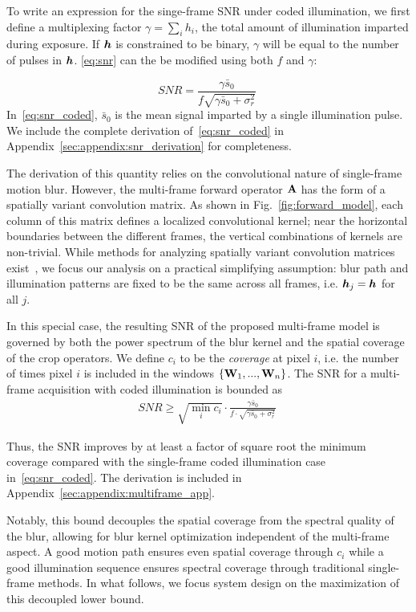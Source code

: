 To write an expression for the singe-frame SNR under coded illumination, we first define a multiplexing factor $\gamma=\sum_{i} h_i$, the total amount of illumination imparted during exposure. If $\bm{h}$ is constrained to be binary, $\gamma$ will be equal to the number of pulses in $\bm{h}$. \eqref{eq:snr} can the be modified using both $f$ and $\gamma$:

\begin{equation}
    \label{eq:snr_coded}
    SNR  = \frac{\gamma\bar{s}_0}{f\sqrt{\gamma\bar{s}_0 + \sigma^2_{r}}}\:
\end{equation}
In~\eqref{eq:snr_coded}, $\bar{s}_0$ is the mean signal imparted by a single illumination pulse. We include the complete derivation of~\eqref{eq:snr_coded} in Appendix~\ref{sec:appendix:snr_derivation} for completeness. 

The derivation of this quantity relies on the convolutional nature of single-frame motion blur. 
However, the multi-frame forward operator $\mathbf{A}$ has the form of a spatially variant convolution matrix. As shown in Fig.~\ref{fig:forward_model},
each column of this matrix defines a localized convolutional kernel; near the horizontal boundaries between the different frames, the vertical combinations of kernels are non-trivial. 
While methods for analyzing spatially variant convolution matrices exist~\cite{chan2011bounds}, we focus our analysis on a practical simplifying assumption: blur path and illumination patterns are fixed to be the same across all frames, i.e. $\bm{h}_j=\bm{h}$ for all $j$.

In this special case, the resulting SNR of the proposed multi-frame model is governed by both the power spectrum of the blur kernel and the spatial coverage of the crop operators. We define $c_i$ to be the \textit{coverage} at pixel $i$, i.e. the number of times pixel $i$ is included in the windows $\{\mathbf{W}_1,...,\mathbf{W}_n\}$.
The SNR for a multi-frame acquisition with coded illumination is bounded as
\begin{align*}
    SNR  \geq \sqrt{
    \min_{i} c_i}  \cdot \frac{ \gamma\bar{s}_0}{f\cdot \sqrt{\gamma\bar{s}_0 + \sigma^2_{r}}}\:
\end{align*}

Thus, the SNR improves by at least a factor of square root the minimum coverage compared with the single-frame coded illumination case in~\eqref{eq:snr_coded}. The derivation is included in Appendix~\ref{sec:appendix:multiframe_app}.

Notably, this bound decouples the spatial coverage from the spectral quality of the blur, allowing for blur kernel optimization independent of the multi-frame aspect. A good motion path ensures even spatial coverage through $c_i$ while a good illumination sequence ensures spectral coverage through traditional single-frame methods. In what follows, we focus system design on the maximization of this decoupled lower bound. 

